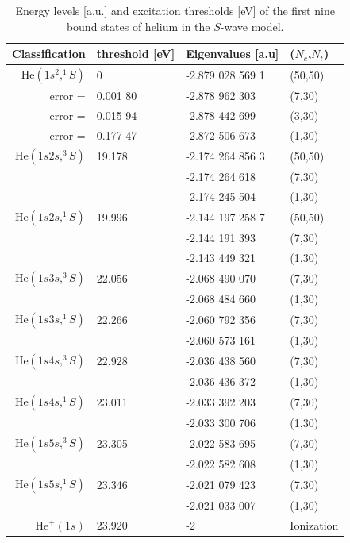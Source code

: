 \documentclass[aip
, pra
, showpacs
, aps
, twocolumn
, groupedaddress
, floatfix
]{revtex4}
\begin{document}
\begin{table}[htb]
\caption{\label{Tab_ENGS}
Energy levels [a.u.] and excitation thresholds [eV] of the first nine bound states of helium in the
$S$-wave model.
}
\begin{ruledtabular}
\begin{tabular}{rlll}
Classification & threshold [eV] & Eigenvalues [a.u] & ($N_c$,$N_t$)   \\
\hline
$\mbox{He}(1s^2,^1S)$ & 0  & -2.879 028 569 1 &  (50,50)   \\ %
            error =   & 0.001 80 & -2.878 962 303   &  (7,30)    \\
            error =   & 0.015 94 & -2.878 442 699   &  (3,30)    \\
            error =   & 0.177 47 & -2.872 506 673   &  (1,30)    \\
\hline
$\mbox{He}(1s2s,^3S)$   & 19.178  & -2.174 264 856 3 & (50,50) \\  %
                 &  & -2.174 264 618   &  (7,30)   \\
                &  & -2.174 245 504   &  (1,30)    \\
\hline
$\mbox{He}(1s2s,^1S)$     &  19.996 & -2.144 197 258 7 &  (50,50) \\ %
                          &  & -2.144 191 393   &  (7,30)   \\
                          &   & -2.143 449 321   &  (1,30)    \\
\hline
$\mbox{He}(1s3s,^3S)$     & 22.056  & -2.068 490 070   &  (7,30)   \\
                          &        & -2.068 484 660   &  (1,30)    \\
\hline
$\mbox{He}(1s3s,^1S)$     & 22.266   & -2.060 792 356   & (7,30)    \\
                          &          & -2.060 573 161   &  (1,30)    \\
\hline
$\mbox{He}(1s4s,^3S)$    & 22.928  & -2.036 438 560   &  (7,30)    \\
                         &         & -2.036 436 372   &  (1,30)   \\
\hline
$\mbox{He}(1s4s,^1S)$   &  23.011 & -2.033 392 203 &  (7,30)   \\
                        &         & -2.033 300 706 &  (1,30)   \\
\hline
$\mbox{He}(1s5s,^3S)$   &   23.305  & -2.022 583 695   &  (7,30)    \\
                        &           & -2.022 582 608   &  (1,30)    \\
\hline
$\mbox{He}(1s5s,^1S)$   &  23.346   & -2.021 079 423   &  (7,30)    \\
                        &              & -2.021 033 007   &  (1,30)    \\
\hline
$\mbox{He}^+(1s)$       &  23.920 & -2 	 &    Ionization \\


\end{tabular}
\end{ruledtabular}
\end{table}
\end{document}
